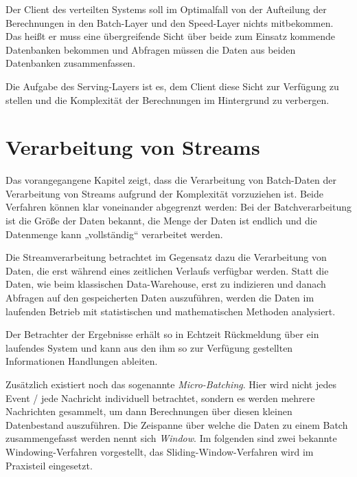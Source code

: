 \documentclass[a4paper,11pt]{scrartcl}
\begin{document}
  Der Client des verteilten Systems soll im Optimalfall von der Aufteilung der
  Berechnungen in den Batch-Layer und den Speed-Layer nichts mitbekommen. Das
  heißt er muss eine übergreifende Sicht über beide zum Einsatz kommende
  Datenbanken bekommen und Abfragen müssen die Daten aus beiden Datenbanken
  zusammenfassen.

  Die Aufgabe des Serving-Layers ist es, dem Client diese Sicht zur Verfügung zu
  stellen und die Komplexität der Berechnungen im Hintergrund zu verbergen.

  \section{Verarbeitung von Streams}
  Das vorangegangene Kapitel zeigt, dass die Verarbeitung von Batch-Daten der
  Verarbeitung von Streams aufgrund der Komplexität vorzuziehen ist. Beide
  Verfahren können klar voneinander abgegrenzt werden: Bei der Batchverarbeitung
  ist die Größe der Daten bekannt, die Menge der Daten ist endlich und die
  Datenmenge kann „vollständig“ verarbeitet werden.

  Die Streamverarbeitung betrachtet im Gegensatz dazu die Verarbeitung von Daten,
  die erst während eines zeitlichen Verlaufs verfügbar werden. Statt die Daten,
  wie beim klassischen Data-Warehouse, erst zu indizieren und danach Abfragen auf
  den gespeicherten Daten auszuführen, werden die Daten im laufenden Betrieb mit
  statistischen und mathematischen Methoden analysiert.

  Der Betrachter der Ergebnisse erhält so in Echtzeit Rückmeldung über ein
  laufendes System und kann aus den ihm so zur Verfügung gestellten Informationen
  Handlungen ableiten.

  Zusätzlich existiert noch das sogenannte \textit{Micro-Batching}.  Hier wird
  nicht jedes Event / jede Nachricht individuell betrachtet, sondern es werden
  mehrere Nachrichten gesammelt, um dann Berechnungen über diesen kleinen
  Datenbestand auszuführen. Die Zeispanne über welche die Daten zu einem Batch
  zusammengefasst werden nennt sich \textit{Window}.\cite[S.~452]{kleppmann17}
  Im folgenden sind zwei bekannte Windowing-Verfahren vorgestellt, das
  Sliding-Window-Verfahren wird im Praxisteil eingesetzt.
\end{document}
